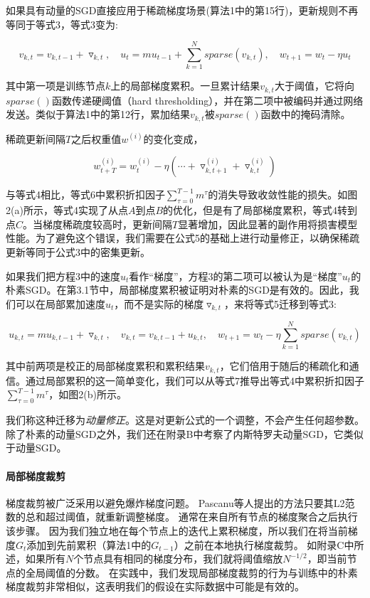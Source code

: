 如果具有动量的SGD直接应用于稀疏梯度场景(算法1中的第15行)，更新规则不再等同于等式3，等式3变为:

\begin{equation}
	\label{eq:nomc}
	v_{k,t} = v_{k,t-1} + \triangledown_{k, t},\quad u_{t} = mu_{t-1} + \sum_{k=1}^{N} sparse\left( v_{k, t}\right) ,\quad  w_{t+1} = w_{t} - \eta u_{t}
\end{equation}

其中第一项是训练节点$k$上的局部梯度累积。一旦累计结果$v_{k,t}$大于阈值，它将向$sparse()$函数传递硬阈值（hard thresholding），并在第二项中被编码并通过网络发送。类似于算法1中的第12行，累加结果$v_{k,t}$被$sparse()$函数中的掩码清除。

稀疏更新间隔$T$之后权重值$w^{(i)}$的变化变成，

\begin{equation}
	\label{eq:nomc_change}
	w_{t+T}^{(i)} = w_{t}^{(i)} - \eta \left(\cdots + \triangledown^{(i)}_{k,t+1} + \triangledown^{(i)}_{k,t}\right)
\end{equation}

与等式4相比，等式6中累积折扣因子$\sum_{\tau=0}^{T-1} m^{\tau}$的消失导致收敛性能的损失。如图2(a)所示，等式4实现了从点$A$到点$B$的优化，但是有了局部梯度累积，等式4转到点$C$。当梯度稀疏度较高时，更新间隔$T$显著增加，因此显著的副作用将损害模型性能。为了避免这个错误，我们需要在公式5的基础上进行动量修正，以确保稀疏更新等同于公式3中的密集更新。

如果我们把方程3中的速度$u_t$看作“梯度”，方程3的第二项可以被认为是“梯度”$u_t$的朴素SGD。在第3.1节中，局部梯度累积被证明对朴素的SGD是有效的。因此，我们可以在局部累加速度$u_t$，而不是实际的梯度$\triangledown_{k,t}$，来将等式5迁移到等式3:

\begin{equation}
	\label{eq:mc}
	u_{k,t} = mu_{k,t-1} + \triangledown_{k,t},\quad  v_{k,t} = v_{k,t-1} + u_{k,t},\quad   w_{t+1} = w_{t} - \eta \sum_{k=1}^{N} sparse\left( v_{k,t}\right) 
\end{equation}

其中前两项是校正的局部梯度累积和累积结果$v_{k,t}$，它们倍用于随后的稀疏化和通信。通过局部累积的这一简单变化，我们可以从等式7推导出等式4中累积折扣因子$\sum_{\tau=0}^{T-1} m^{\tau}$，如图2(b)所示。

我们称这种迁移为\emph{动量修正}。这是对更新公式的一个调整，不会产生任何超参数。除了朴素的动量SGD之外，我们还在附录B中考察了内斯特罗夫动量SGD，它类似于动量SGD。

\paragraph{局部梯度裁剪}
梯度裁剪被广泛采用以避免爆炸梯度问题。 Pascanu等人提出的方法只要其L2范数的总和超过阈值，就重新调整梯度。 通常在来自所有节点的梯度聚合之后执行该步骤。 因为我们独立地在每个节点上的迭代上累积梯度，所以我们在将当前梯度$G_t$添加到先前累积（算法1中的$G_{t-1}$）之前在本地执行梯度裁剪。 如附录C中所述，如果所有$N$个节点具有相同的梯度分布，我们就将阈值缩放$N^{-1/2}$，即当前节点的全局阈值的分数。 在实践中，我们发现局部梯度裁剪的行为与训练中的朴素梯度裁剪非常相似，这表明我们的假设在实际数据中可能是有效的。


